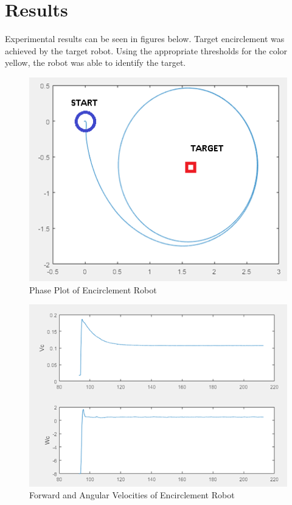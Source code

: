 \section{Results}
Experimental results can be seen in figures below. Target encirclement was achieved by the target robot. Using the appropriate thresholds for the color yellow, the robot was able to identify the target.
\begin{figure}[htbp]
\begin{center}
\includegraphics[width=5in]{11}
\caption{Phase Plot of Encirclement Robot} \label{fig:11}
\end{center}
\end{figure}

\begin{figure}[htbp]
\begin{center}
\includegraphics[width=5in]{12}
\caption{Forward and Angular Velocities of Encirclement Robot} \label{fig:12}
\end{center}
\end{figure}

